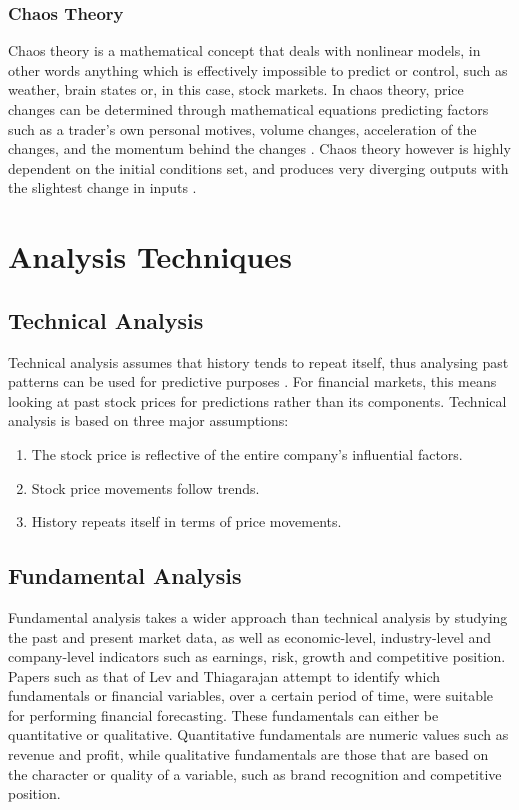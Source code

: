 \documentclass{UoYCSproject}
\begin{document}
\subsubsection{Chaos Theory}
Chaos theory is a mathematical concept that deals with nonlinear models, in other words anything which is effectively impossible to predict or control, such as weather, brain states or, in this case, stock markets. In chaos theory, price changes can be determined through mathematical equations predicting factors such as a trader's own personal motives, volume changes, acceleration of the changes, and the momentum behind the changes \cite{chaostheory}. Chaos theory however is highly dependent on the initial conditions set, and produces very diverging outputs with the slightest change in inputs \cite{kellert1993wake}. 

\section{Analysis Techniques}
\subsection{Technical Analysis}
Technical analysis assumes that history tends to repeat itself, thus analysing past patterns can be used for predictive purposes \cite{levy1966conceptual}. For financial markets, this means looking at past stock prices for predictions rather than its components. Technical analysis is based on three major assumptions:
\begin{enumerate}
    \item The stock price is reflective of the entire company's influential factors.
    \item Stock price movements follow trends.
    \item History repeats itself in terms of price movements.
\end{enumerate}

\subsection{Fundamental Analysis}
Fundamental analysis takes a wider approach than technical analysis by studying the past and present market data, as well as economic-level, industry-level and company-level indicators such as earnings, risk, growth and competitive position. Papers such as that of Lev and Thiagarajan \cite{lev1993fundamental} attempt to identify which fundamentals or financial variables, over a certain period of time, were suitable for performing financial forecasting. These fundamentals can either be quantitative or qualitative. Quantitative fundamentals are numeric values such as revenue and profit, while qualitative fundamentals are those that are based on the character or quality of a variable, such as brand recognition and competitive position. 
\end{document}
